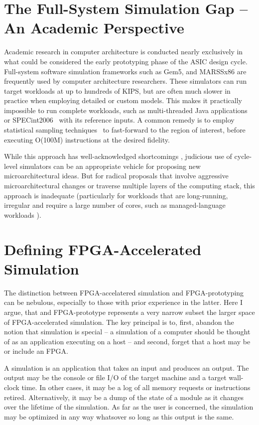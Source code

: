 \section{The Full-System Simulation Gap -- An Academic Perspective}

Academic research in computer architecture is conducted nearly exclusively in
what could be considered the early prototyping phase of the ASIC design cycle.
Full-system software simulation frameworks such as Gem5\cite{gem5}, and
MARSSx86\cite{marssx86} are frequently used by computer architecture
researchers. These simulators can run target workloads at up to hundreds of
KIPS, but are often much slower in practice when employing detailed or custom
models. This makes it practically impossible to run complete workloads, such as
multi-threaded Java applications or SPECint2006~\cite{spec} with its reference
inputs. A common remedy is to employ statistical sampling
techniques~\cite{smarts} to fast-forward to the region of interest, before
executing O(100M) instructions at the desired fidelity.

While this approach has well-acknowledged shortcomings \cite{gem5error},
judicious use of cycle-level simulators can be an appropriate vehicle for
proposing new microarchitectural ideas. But for radical proposals that involve
aggressive microarchitectural changes or traverse multiple layers of the
computing stack, this approach is inadequate (particularly for workloads that
are long-running, irregular and require a large number of cores, such as
managed-language workloads \cite{MicroSimPanel}).

\section{Defining FPGA-Accelerated Simulation}

The distinction between FPGA-accelatered simulation and FPGA-prototyping can be
nebulous, especially to those with prior experience in the latter. Here I
argue, that and FPGA-prototype represents a very narrow subset the larger space
of FPGA-accelerated simulation.  The key principal is to, first, abandon the
notion that simulation is special -- a simulation of a computer should
be thought of as an application executing on a host -- and second, forget that a
host may be or include an FPGA.

A simulation is an application that takes an input and produces an output.  The
output may be the console or file I/O of the target machine and a target
wall-clock time. In other cases, it may be a log of all memory requests or
instructions retired. Alternatively, it may be a dump of the state of a module
as it changes over the lifetime of the simulation.  As far as the user is
concerned, the simulation may be optimized in any way whatsover so long as this
output is the same.

